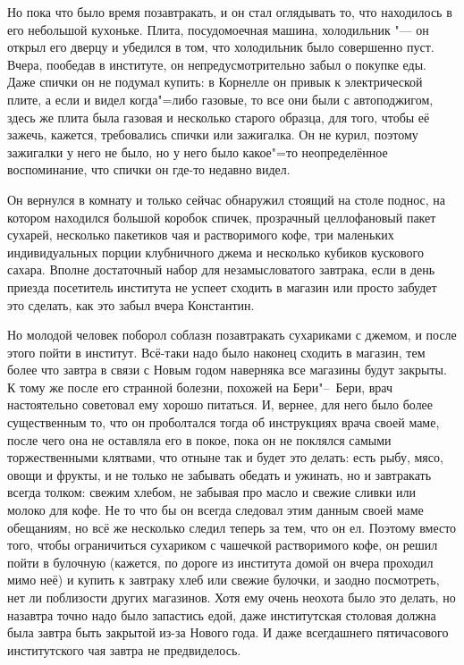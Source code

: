 Но пока что было время позавтракать, и он стал оглядывать то, что находилось в
его небольшой кухоньке.
Плита, посудомоечная машина, холодильник "--- он открыл его дверцу и убедился в
том, что холодильник было совершенно пуст.
Вчера, пообедав в институте, он непредусмотрительно забыл о покупке еды.
Даже спички он не подумал купить: в Корнелле он привык к электрической плите, а
если и видел когда"=либо газовые, то все они были с автоподжигом, здесь же плита
была газовая и несколько старого образца, для того, чтобы её зажечь, кажется,
требовались спички или зажигалка.
Он не курил, поэтому зажигалки у него не было, но у него было какое"=то
неопределённое воспоминание, что спички он где-то недавно видел.

Он вернулся в комнату и только сейчас обнаружил стоящий на столе поднос, на
котором находился большой коробок спичек, прозрачный целлофановый пакет
сухарей, несколько пакетиков чая и растворимого кофе, три маленьких
индивидуальных порции клубничного джема и несколько кубиков кускового сахара.
Вполне достаточный набор для незамысловатого завтрака, если в день приезда
посетитель института не успеет сходить в магазин или просто забудет это сделать,
как это забыл вчера Константин.

Но молодой человек поборол соблазн позавтракать сухариками с джемом, и после
этого пойти в институт.
Всё-таки надо было наконец сходить в магазин, тем более что завтра в связи с
Новым годом наверняка все магазины будут закрыты.
К тому же после его странной болезни, похожей на Бери"--~Бери, врач настоятельно
советовал ему хорошо питаться.
И, вернее, для него было более существенным то, что он проболтался тогда об
инструкциях врача своей маме, после чего она не оставляла его в покое, пока он
не поклялся самыми торжественными клятвами, что отныне так и будет это делать:
есть рыбу, мясо, овощи и фрукты, и не только не забывать обедать и ужинать, но и
завтракать всегда толком: свежим хлебом, не забывая про масло и свежие сливки
или молоко для кофе.
Не то что бы он всегда следовал этим данным своей маме обещаниям, но всё же
несколько следил теперь за тем, что он ел.
Поэтому вместо того, чтобы ограничиться сухариком с чашечкой растворимого кофе,
он решил пойти в булочную (кажется, по дороге из института домой он вчера
проходил мимо неё) и купить к завтраку хлеб или свежие булочки, и заодно
посмотреть, нет ли поблизости других магазинов.
Хотя ему очень неохота было это делать, но назавтра точно надо было запастись
едой, даже институтская столовая должна была завтра быть закрытой из-за Нового
года.
И даже всегдашнего пятичасового институтского чая завтра не предвиделось.

